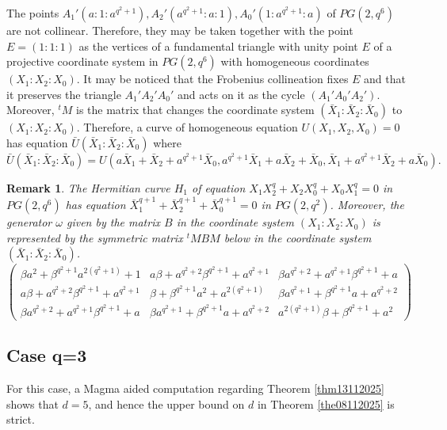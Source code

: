 \documentclass[9pt]{article}
\theoremstyle{plain}
\newtheorem{rem}[thm]{Remark}
\begin{document}
The points   $A_1'(a:1:a^{q^2+1}),A_2'(a^{q^2+1}:a:1),A_0'(1:a^{q^2+1}:a)$ of $PG(2,q^6)$ are not collinear. Therefore, they may be taken together with the point $E=(1:1:1)$ as the vertices of a fundamental triangle with unity point $E$ of a projective coordinate system in $PG(2,q^6)$ with homogeneous coordinates $(X_1:X_2:X_0)$. It may be noticed that the Frobenius collineation fixes $E$ and that it preserves the triangle $A_1'A_2'A_0'$ and acts on it as the cycle $(A_1'A_0'A_2')$. Moreover, $^tM$ is the matrix that changes the coordinate system $(\bar{X}_1:\bar{X}_2:\bar{X}_0)$ to  $(X_1:X_2:X_0)$.  Therefore, a curve of homogeneous equation $U(X_1,X_2,X_0)=0$ has equation $\bar{U}(\bar{X}_1:\bar{X}_2:\bar{X}_0)$ where 
$$\bar{U}(\bar{X}_1:\bar{X}_2:\bar{X}_0)=U(a\bar{X}_1+\bar{X}_2+a^{q^2+1}\bar{X}_0,a^{q^2+1}\bar{X}_1+a\bar{X}_2+\bar{X}_0,\bar{X}_1+a^{q^2+1}\bar{X}_2+a\bar{X}_0).$$
\begin{rem}
    \label{rem16112025A}
\rm{The Hermitian curve $H_1$ of equation $X_1X_2^q+X_2X_0^q+X_0X_1^q=0$ in $PG(2,q^6)$ has equation $\bar{X}_1^{q+1}+\bar{X}_2^{q+1}+\bar{X}_0^{q+1}=0$ in $PG(2,q^2)$. Moreover, the generator $\omega$ given by the matrix $B$ in the coordinate system $(X_1:X_2:X_0)$ is represented by the symmetric matrix $^tMBM$ below in the coordinate system $(\bar{X}_1:\bar{X}_2:\bar{X}_0)$.} 
  \[\left(\begin{array}{ccc} 
\beta a^2+\beta^{q^2+1}a^{2(q^2+1)}+1 & a\beta+a^{q^2+2}\beta^{q^2+1}+a^{q^2+1}  & \beta a^{q^2+2}+a^{q^2+1}\beta^{q^2+1}+a\\
a\beta+a^{q^2+2}\beta^{q^2+1}+a^{q^2+1}  & \beta+\beta^{q^2+1}a^2+a^{2(q^2+1)}  &  \beta a^{q^2+1}+\beta^{q^2+1}a+a^{q^2+2}\\
\beta a^{q^2+2}+a^{q^2+1}\beta^{q^2+1}+a & \beta a^{q^2+1}+\beta^{q^2+1}a+a^{q^2+2} & a^{2(q^2+1)}\beta+\beta^{q^2+1}+a^2
\end{array}\right)\]
\end{rem}
\subsection{Case q=3} For this case, a Magma aided computation regarding Theorem \ref{thm13112025} shows that $d=5$, and hence the upper bound on $d$ in Theorem \ref{the08112025} is strict. 
\end{document}

